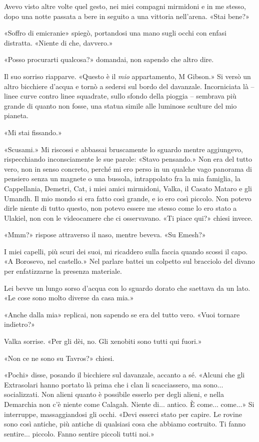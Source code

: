 Avevo visto altre volte quel gesto, nei miei compagni mirmidoni e in me
stesso, dopo una notte passata a bere in seguito a una vittoria
nell'arena. «Stai bene?»

«Soffro di emicranie» spiegò, portandosi una mano sugli occhi con enfasi
distratta. «Niente di che, davvero.»

«Posso procurarti qualcosa?» domandai, non sapendo che altro dire.

Il suo sorriso riapparve. «Questo è il \emph{mio} appartamento, M
Gibson.» Si versò un altro bicchiere d'acqua e tornò a sedersi sul bordo
del davanzale. Incorniciata là -- linee curve contro linee squadrate,
sullo sfondo della pioggia -- sembrava più grande di quanto non fosse,
una statua simile alle luminose sculture del mio pianeta.

«Mi stai fissando.»

«Scusami.» Mi riscossi e abbassai bruscamente lo sguardo mentre
aggiungevo, rispecchiando inconsciamente le sue parole: «Stavo
pensando.» Non era del tutto vero, non in senso concreto, perché mi ero
perso in un qualche vago panorama di pensiero senza un magnete o una
bussola, intrappolato fra la mia famiglia, la Cappellania, Demetri, Cat,
i miei amici mirmidoni, Valka, il Casato Mataro e gli Umandh. Il mio
mondo si era fatto così grande, e io ero così piccolo. Non potevo dirle
niente di tutto questo, non potevo essere me stesso come lo ero stato a
Ulakiel, non con le videocamere che ci osservavano. «Ti piace qui?»
chiesi invece.

«Mmm?» rispose attraverso il naso, mentre beveva. «Su Emesh?»

I miei capelli, più scuri dei suoi, mi ricaddero sulla faccia quando
scossi il capo. «A Borosevo, nel castello.» Nel parlare battei un
colpetto sul bracciolo del divano per enfatizzarne la presenza
materiale.

Lei bevve un lungo sorso d'acqua con lo sguardo dorato che saettava da
un lato. «Le cose sono molto diverse da casa mia.»

«Anche dalla mia» replicai, non sapendo se era del tutto vero. «Vuoi
tornare indietro?»

Valka sorrise. «Per gli dèi, no. Gli xenobiti sono tutti qui fuori.»

«Non ce ne sono su Tavros?» chiesi.

«Pochi» disse, posando il bicchiere sul davanzale, accanto a sé. «Alcuni
che gli Extrasolari hanno portato là prima che i clan li scacciassero,
ma sono... socializzati. Non alieni quanto è possibile esserlo per degli
alieni, e nella Demarchia non c'è niente come Calagah. Niente di...
antico. È come... come...» Si interruppe, massaggiandosi gli occhi.
«Devi esserci stato per capire. Le rovine sono così antiche, più antiche
di qualsiasi cosa che abbiamo costruito. Ti fanno sentire... piccolo.
Fanno sentire piccoli tutti noi.»

